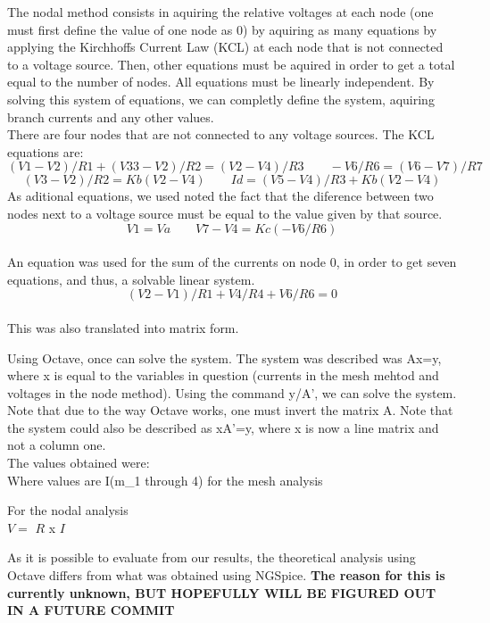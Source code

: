 The nodal method consists in aquiring the relative voltages at each node (one must first define the value of one node as 0) by aquiring as many equations by applying the Kirchhoffs Current Law (KCL) at each node that is not connected to a voltage source. Then, other equations must be aquired in order to get a total equal to the number of nodes. All equations must be linearly independent. By solving this system of equations, we can completly define the system, aquiring branch currents and any other values.\\
There are four nodes that are not connected to any voltage sources. The KCL equations are: 
\[(V1-V2)/R1+(V33-V2)/R2=(V2-V4)/R3 \quad \quad -V6/R6=(V6-V7)/R7\]
 \[(V3-V2)/R2=Kb(V2-V4) \quad \quad Id=(V5-V4)/R3+Kb(V2-V4) \]
As aditional equations, we used noted the fact that the diference between two nodes next to a voltage source must be equal to the value given by that source. 
\[V1=Va \quad \quad  V7-V4=Kc(-V6/R6)\]\\
An equation was used for the sum of the currents on node 0, in order to get seven equations, and thus, a solvable linear system.
 \[(V2-V1)/R1+V4/R4+V6/R6=0\]\\
This was also translated into matrix form.







Using Octave, once can solve the system. The system was described was Ax=y, where x is equal to the variables in question (currents in the mesh mehtod and voltages in the node method). Using the command y/A', we can solve the system. Note that due to the way Octave works, one must invert the matrix A. Note that the system could also be described as xA'=y, where x is now a line matrix and not a column one.\\
The values obtained were:\\


Where values are I(m_1 through 4) for the mesh analysis


For the nodal analysis\\

$V =$  $R$ x $I$ 


As it is possible to evaluate from our results, the theoretical analysis using Octave differs from what was obtained using NGSpice. \textbf{The reason for this is currently unknown, BUT HOPEFULLY WILL BE FIGURED OUT IN A FUTURE COMMIT}
